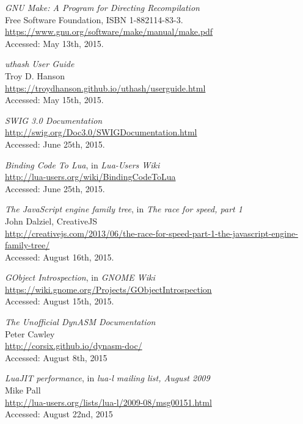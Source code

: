 \begin{thebibliography}{99}
		\emph{GNU Make: A Program for Directing Recompilation} \\
		Free Software Foundation, ISBN 1-882114-83-3. \\
		\url{https://www.gnu.org/software/make/manual/make.pdf} \\
		Accessed: May 13th, 2015.

		\emph{uthash User Guide} \\
		Troy D. Hanson \\
		\url{https://troydhanson.github.io/uthash/userguide.html} \\
		Accessed: May 15th, 2015.

		\emph{SWIG 3.0 Documentation} \\
		\url{http://swig.org/Doc3.0/SWIGDocumentation.html} \\
		Accessed: June 25th, 2015.

		\emph{Binding Code To Lua}, in \emph{Lua-Users Wiki} \\
		\url{http://lua-users.org/wiki/BindingCodeToLua} \\
		Accessed: June 25th, 2015.

		\emph{The JavaScript engine family tree},
		in \emph{The race for speed, part 1}  \\
		John Dalziel, CreativeJS \\
		\url{http://creativejs.com/2013/06/the-race-for-speed-part-1-the-javascript-engine-family-tree/} \\
		Accessed: August 16th, 2015.

		\emph{GObject Introspection}, in \emph{GNOME Wiki} \\
		\url{https://wiki.gnome.org/Projects/GObjectIntrospection} \\
		Accessed: August 15th, 2015.

		\emph{The Unofficial DynASM Documentation} \\
		Peter Cawley \\
		\url{http://corsix.github.io/dynasm-doc/} \\
		Accessed: August 8th, 2015

		\emph{LuaJIT performance}, in \emph{lua-l mailing list, August 2009} \\
		Mike Pall \\
		\url{http://lua-users.org/lists/lua-l/2009-08/msg00151.html} \\
		Accessed: August 22nd, 2015


\end{thebibliography}
